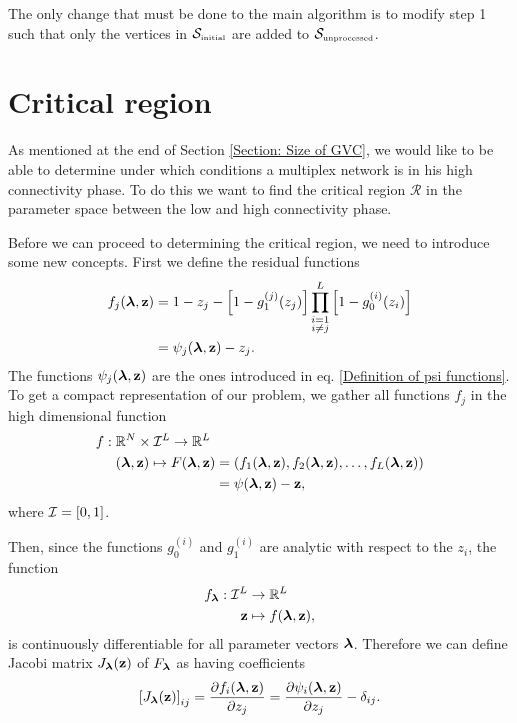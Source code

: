 \documentclass[
11pt, %
english, %
singlespacing, %
nolistspacing, %
liststotoc, %
headsepline, %
]{MastersDoctoralThesis} %
\begin{document}
The only change that must be done to the main algorithm is to modify step 1 such that only the vertices in $\mathcal{S}_{\text{\tiny initial}}$ are added to $\mathcal{S}_{\text{\tiny unprocessed}}$.

\section{Critical region}
\label{Section: Boundary condition for multilayer}

As mentioned at the end of Section \ref{Section: Size of GVC}, we would like to be able to determine under which conditions a multiplex network is in his high connectivity phase. To do this we want to find the critical region $\mathcal{R}$ in the parameter space between the low and high connectivity phase.

Before we can proceed to determining the critical region, we need to introduce some new concepts. First we define the residual functions
\begin{align}
	f_j(\boldsymbol{\mathrm{\lambda}}, \boldsymbol{\mathrm{z}}) &= 1 - z_j - \left[1 - g_1^{(j)}(z_j) \right] \prod_{\substack{i = 1 \\ i \neq j}}^{L}  \left[1 - g_0^{(i)}(z_i) \right] \label{Definition fj} \\
		&= \psi_j(\boldsymbol{\mathrm{\lambda}}, \boldsymbol{\mathrm{z}}) - z_j.
\end{align}
The functions $\psi_j(\boldsymbol{\mathrm{\lambda}}, \boldsymbol{\mathrm{z}})$ are the ones introduced in eq. \eqref{Definition of psi functions}. To get a compact representation of our problem, we gather all functions $f_j$ in the high dimensional function
\begin{align}
	f : \; &\mathbb{R}^N \times \unitinterval^L \rightarrow \mathbb{R}^L\\
	&(\lambdavec, \zvec) \mapsto F(\lambdavec, \zvec) = (f_1(\lambdavec, \zvec), f_2(\lambdavec, \zvec), \dots, f_L(\lambdavec, \zvec)) \label{Definition F} \\
		&\hphantom{(\lambdavec, \zvec) \mapsto F(\lambdavec, \zvec)} = \psi(\lambdavec, \zvec) - \zvec,
\end{align}
where $\mathcal{I} = [0, 1]$.

Then, since the functions $g_0^{(i)}$ and $g_1^{(i)}$ are analytic with respect to the $z_i$, the function
\begin{align}
	f_{\boldsymbol{\mathrm{\lambda}}} : \mathcal{I}^L &\rightarrow \mathbb{R}^L\\
		\boldsymbol{\mathrm{z}} &\mapsto f(\boldsymbol{\mathrm{\lambda}}, \boldsymbol{\mathrm{z}}),
\end{align}
is continuously differentiable for all parameter vectors $\boldsymbol{\mathrm{\lambda}}$. Therefore we can define Jacobi matrix $J_{\boldsymbol{\mathrm{\lambda}}}(\boldsymbol{\mathrm{z}})$ of $F_{\boldsymbol{\mathrm{\lambda}}}$ as having coefficients
\begin{align}
	\left[ J_{\boldsymbol{\mathrm{\lambda}}}(\boldsymbol{\mathrm{z}}) \right]_{ij} = \frac{\partial f_i(\boldsymbol{\mathrm{\lambda}},\boldsymbol{\mathrm{z}})}{\partial z_j} = \frac{\partial \psi_i(\boldsymbol{\mathrm{\lambda}},\boldsymbol{\mathrm{z}})}{\partial z_j} - \delta_{ij}.
\end{align}
\end{document}
